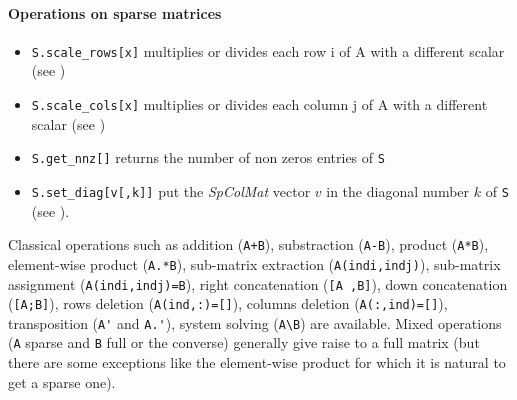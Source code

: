 \paragraph{Operations on sparse matrices}
\begin{itemize}
\item \verb+S.scale_rows[x]+ multiplies or divides each row i of A with a different scalar (see ) 
\item \verb+S.scale_cols[x]+ multiplies or divides each column j of A with a different scalar (see )
\item \verb+S.get_nnz[]+ returns the number of non zeros entries of \verb+S+ 
\item \verb+S.set_diag[v[,k]]+ put the \emph{SpColMat} vector $v$ in the diagonal number $k$ of \verb+S+
 (see ).

\end{itemize}


Classical operations such as addition (\verb-A+B-), substraction  (\verb+A-B+), product (\verb+A*B+), 
element-wise product (\verb+A.*B+), sub-matrix extraction (\verb+A(indi,indj)+), 
sub-matrix assignment (\verb+A(indi,indj)=B+), right concatenation  (\verb+[A ,B]+), 
down concatenation  (\verb+[A;B]+),  rows deletion (\verb+A(ind,:)=[]+), columns deletion (\verb+A(:,ind)=[]+), 
transposition (\verb+A'+ and \verb+A.'+),  system solving (\verb+A\B+) are available. 
Mixed operations (\verb+A+ sparse and \verb+B+ full or the converse) generally give raise to a 
full matrix (but there are some exceptions like the element-wise product for which it is natural 
to get a sparse one). 

